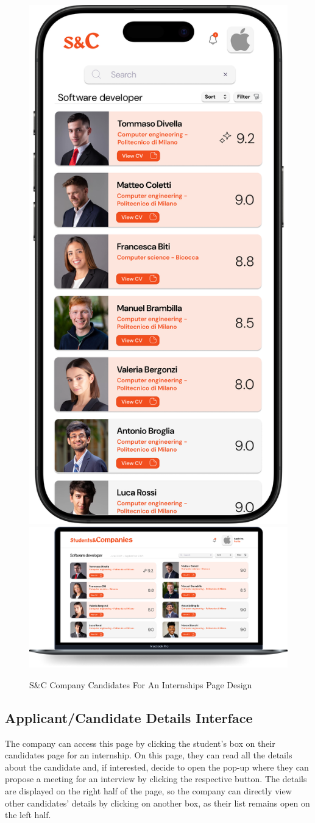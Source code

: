 \begin{figure}[H]
    \centering
    \includegraphics[width=0.2\linewidth]{Images/Mock-up/mobile candidate page company.png}
    \includegraphics[width=0.75\linewidth]{Images/Mock-up/cadidates page company.png}
    \caption{S\&C Company Candidates For An Internships Page Design}
    \label{fig:homepage-design}
\end{figure}

\subsection{Applicant/Candidate Details Interface}

The company can access this page by clicking the student's box on their candidates page for an internship. On this page, they can read all the details about the candidate and, if interested, decide to open the pop-up where they can propose a meeting for an interview by clicking the respective button. The details are displayed on the right half of the page, so the company can directly view other candidates' details by clicking on another box, as their list remains open on the left half. \\

